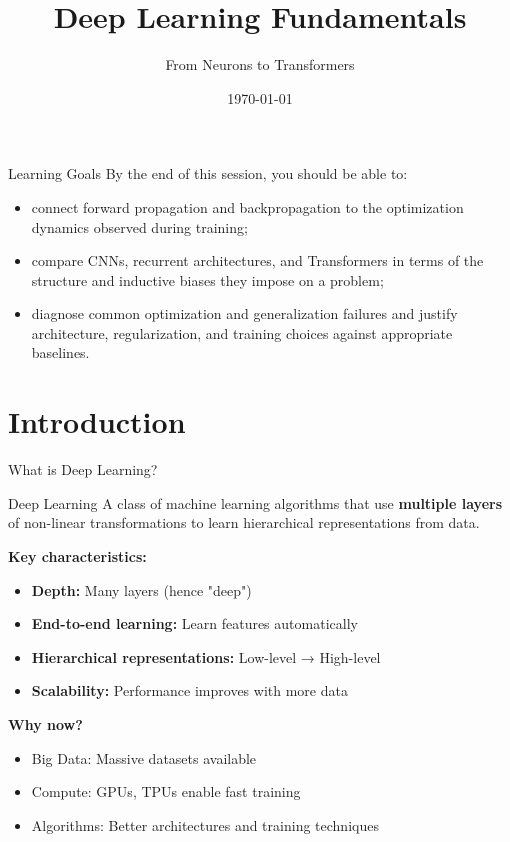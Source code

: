 \documentclass[aspectratio=169]{beamer}
\title{Deep Learning Fundamentals}
\subtitle{From Neurons to Transformers}
\date{\today}
\begin{document}

\begin{frame}
  \titlepage
\end{frame}

\begin{frame}{Learning Goals}
  By the end of this session, you should be able to:
  \begin{itemize}
    \item connect forward propagation and backpropagation to the optimization dynamics observed during training;
    \item compare CNNs, recurrent architectures, and Transformers in terms of the structure and inductive biases they impose on a problem;
    \item diagnose common optimization and generalization failures and justify architecture, regularization, and training choices against appropriate baselines.
  \end{itemize}
\end{frame}

\tocslide

\section{Introduction}

\begin{frame}{What is Deep Learning?}
  \begin{definitionbox}{Deep Learning}
    A class of machine learning algorithms that use \textbf{multiple layers} of non-linear transformations to learn hierarchical representations from data.
  \end{definitionbox}

  \vspace{0.5em}

  \textbf{Key characteristics:}
  \begin{itemize}
    \item \textbf{Depth:} Many layers (hence "deep")
    \item \textbf{End-to-end learning:} Learn features automatically
    \item \textbf{Hierarchical representations:} Low-level → High-level
    \item \textbf{Scalability:} Performance improves with more data
  \end{itemize}

  \vspace{0.5em}

  \textbf{Why now?}
  \begin{itemize}
    \item Big Data: Massive datasets available
    \item Compute: GPUs, TPUs enable fast training
    \item Algorithms: Better architectures and training techniques
  \end{itemize}
\end{frame}
\end{document}
